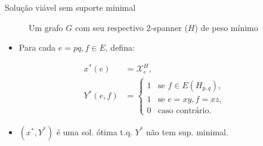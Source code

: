 \documentclass[dvipsnames]{beamer}
\newcommand{\incid}{\mathcal{X}}
\begin{document}
\begin{frame}{Solução viável sem suporte minimal \hyperlink{formmwsp}{\beamergotobutton{$\leftarrow$}}}
\hypertarget{supminimal}{}
\begin{figure}[t] 
  \centering
\caption{Um grafo $G$ com seu respectivo 2-spanner ($H$) de peso mínimo}
\label{fig:exemplo_Y_minimal}
\end{figure}

\begin{itemize}
  \item Para cada $e = pq, f \in E$, defina:
\end{itemize}

\begin{align*}
x^*(e) &= \incid^{H}_{e},\\
Y^*(e,f) &= 
\begin{cases}
    1& \text{se $f \in E(H_{p,q}),$}\\
    1& \text{se $e = xy, f = xz,$}\\
    0& \text{caso contrário.}
\end{cases}
\end{align*}

\begin{itemize}
\item $(x^*,Y^*)$ é uma sol. ótima t.q. $Y^*$
  não tem sup. minimal.
\end{itemize}

  \end{frame}
  
\end{document}
